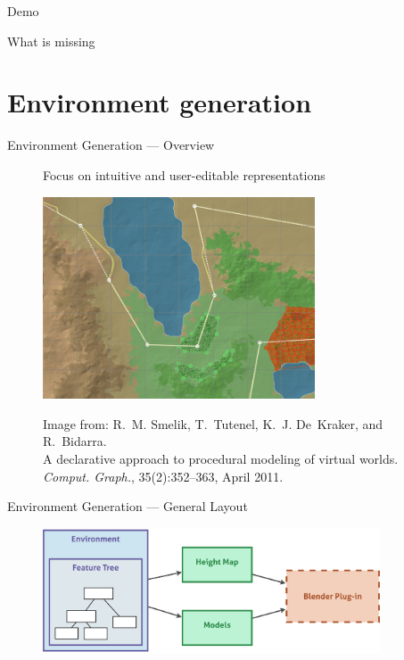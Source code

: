 \documentclass{beamer}
\begin{document}
\begin{frame}{Demo}
\end{frame}

\begin{frame}{What is missing}
\end{frame}

\section{Environment generation}
\begin{frame}{Environment Generation --- Overview}
  \begin{figure}
    \begin{center}
      Focus on intuitive and user-editable representations

      \includegraphics[height=6cm]{input_map.png}

      \tiny
      Image from: %
      R.~M. Smelik, T.~Tutenel, K.~J. De~Kraker, and R.~Bidarra. \\
      A declarative approach to procedural modeling of virtual worlds. \\
      \emph{Comput. Graph.}, 35(2):352--363, April 2011.
    \end{center}
  \end{figure}
\end{frame}

\begin{frame}{Environment Generation --- General Layout}
  \begin{figure}
    \begin{center}
      \includegraphics[width=10cm]{env_global.pdf}
    \end{center}
  \end{figure}
\end{frame}
\end{document}
